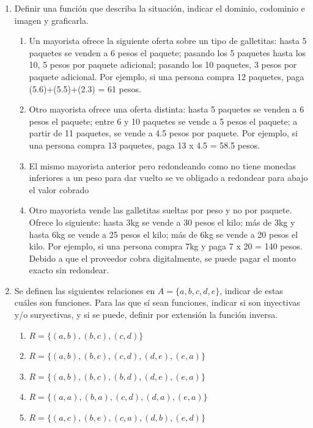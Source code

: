 \documentclass[a4paper]{article}
\newcommand{\exercise}{\item}
\begin{document}
\begin{enumerate}
\begin{enumerate} [label=(\alph*)]
	\end{enumerate}
	\exercise Definir una función que describa la situación, indicar el dominio, codominio e imagen y graficarla.
	\begin{enumerate} [label=(\alph*)]
		\item Un mayorista ofrece la siguiente oferta sobre un tipo de galletitas: hasta 5 paquetes se venden a 6 pesos el paquete; pasando los 5 paquetes hasta los 10, 5 pesos por paquete adicional; pasando los 10 paquetes, 3 pesos por paquete adicional. Por ejemplo, si una persona compra 12 paquetes, paga (5.6)+(5.5)+(2.3) = 61 pesos.
		\item Otro mayorista ofrece una oferta distinta: hasta 5 paquetes se venden a 6 pesos el paquete; entre 6 y 10 paquetes se vende a 5 pesos el paquete; a partir de 11 		paquetes, se vende a 4.5 pesos por paquete. Por ejemplo, si una persona compra 13 paquetes, paga 13 x 4.5 = 58.5 pesos.
		\item El mismo mayorista anterior pero redondeando como no tiene monedas inferiores a un peso para dar vuelto se ve obligado a redondear para abajo el valor cobrado
		\item Otro mayorista vende las galletitas sueltas por peso y no por paquete. Ofrece lo siguiente: hasta 3kg se vende a 30 pesos el kilo; más de 3kg y hasta 6kg se vende a 25 pesos el kilo; más de 6kg se vende a 20 pesos el kilo. Por ejemplo, si una persona compra 7kg y paga 7 x 20 = 140 pesos. Debido a que el proveedor cobra digitalmente, se puede pagar el monto exacto sin redondear.
	\end{enumerate}
	\exercise Se definen las siguientes relaciones en $A = \{a, b, c, d, e\}$, indicar de estas cuáles son funciones. Para las que sí sean funciones, indicar si son inyectivas y/o suryectivas, y si se puede, definir por extensión la función inversa.
	\begin{enumerate} [label=(\alph*)]
		\item $R = \{(a,b), (b,c), (c,d)\}$
		\item $R = \{(a,b), (b,c), (c,d), (d,e), (e,a)\}$
		\item $R = \{(a,b), (b,c), (b,d), (d,e), (e,a)\}$
		\item $R = \{(a,a), (b,a), (c,d), (d,a), (e,a)\}$
		\item $R = \{(a,c), (b,e), (c,a), (d,b), (e,d)\}$

\end{enumerate}
\end{enumerate}
\end{document}
